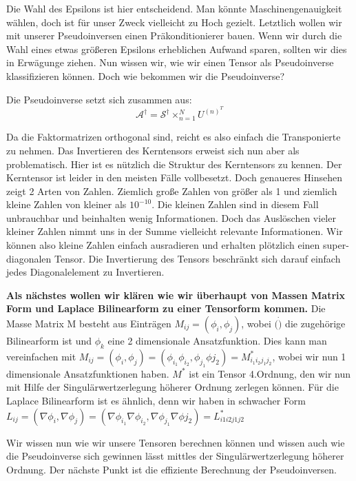 Die Wahl des Epsilons ist hier entscheidend. Man könnte Maschinengenauigkeit wählen, doch ist für unser Zweck vielleicht zu Hoch gezielt. Letztlich wollen wir mit unserer Pseudoinversen einen Präkonditionierer bauen. Wenn wir durch die Wahl eines etwas größeren Epsilons erheblichen Aufwand sparen, sollten wir dies in Erwägunge ziehen.
Nun wissen wir, wie wir einen Tensor als Pseudoinverse klassifizieren können. Doch wie bekommen wir die Pseudoinverse?

Die Pseudoinverse setzt sich zusammen aus:
\begin{equation} \label{eq:pinv}
\mathcal{A}^{\dagger} = \mathcal{S}^{\dagger} \times_{n=1}^{N} U^{ (n) ^{T} }
\end{equation}

Da die Faktormatrizen orthogonal sind, reicht es also einfach die Transponierte zu nehmen. Das Invertieren des Kerntensors erweist sich nun aber als problematisch.
Hier ist es nützlich die Struktur des Kerntensors zu kennen. Der Kerntensor ist leider in den meisten Fälle vollbesetzt. Doch genaueres Hinsehen zeigt 2 Arten von Zahlen. Ziemlich große Zahlen von größer als 1 und ziemlich kleine Zahlen von kleiner als $10^{-10}$. 
Die kleinen Zahlen sind in diesem Fall unbrauchbar und beinhalten wenig Informationen. Doch das Auslöschen vieler kleiner Zahlen nimmt uns in der Summe vielleicht relevante Informationen.
Wir können also kleine Zahlen einfach ausradieren und erhalten plötzlich einen super-diagonalen Tensor. Die Invertierung des Tensors beschränkt sich darauf einfach jedes Diagonalelement zu Invertieren.

\textbf{Als nächstes wollen wir klären wie wir überhaupt von Massen Matrix Form und Laplace Bilinearform zu einer Tensorform kommen.}
Die Masse Matrix M besteht aus Einträgen $M_{ij}= (\phi_i,\phi_j)$, wobei $( \dot )$ die zugehörige Bilinearform ist und $\phi_k$ eine 2 dimensionale Ansatzfunktion. Dies kann man vereinfachen mit
$M_{ij}=(\phi_i,\phi_j)=(\phi_{i_1} \phi_{i_2},\phi_{j_1} \phi{j_2})=M^{*}_{i_1 i_2 j_1 j_2}$, wobei wir nun 1 dimensionale Ansatzfunktionen haben. $M^{*}$ ist ein Tensor 4.Ordnung, den wir nun mit Hilfe der Singulärwertzerlegung höherer Ordnung zerlegen können.
Für die Laplace Bilinearform ist es ähnlich, denn wir haben in schwacher Form $L_{ij}= ( \nabla \phi_i, \nabla \phi_j)=(\nabla \phi_{i_1} \nabla \phi_{i_2}, \nabla \phi_{j_1}  \nabla \phi{j_2})=L^{*}_{i1i2j1j2}$

Wir wissen nun wie wir unsere Tensoren berechnen können und wissen auch wie die Pseudoinverse sich gewinnen lässt mittles der Singulärwertzerlegung höherer Ordnung.
Der nächste Punkt ist die effiziente Berechnung der Pseudoinversen.



